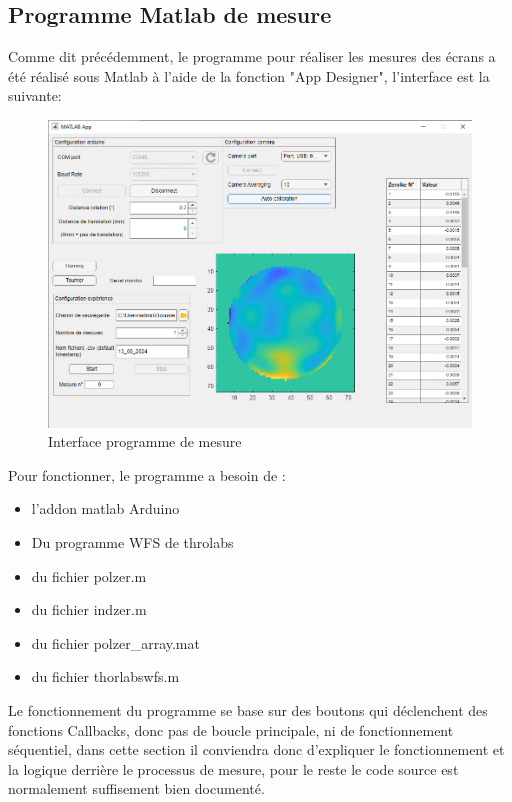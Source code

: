 \newpage
\subsection{Programme Matlab de mesure}
Comme dit précédemment, le programme pour réaliser les mesures des écrans a été réalisé sous Matlab à l'aide de la fonction "App Designer", l'interface est la suivante:
\begin{figure}[H]
    \centering
    \includegraphics[width = \textwidth]{assets/figures/ameliorations/capture interface.png}
    \caption{Interface programme de mesure}
\end{figure}
Pour fonctionner, le programme a besoin de :
\begin{itemize}
    \item l'addon matlab Arduino
    \item Du programme WFS de throlabs \cite{WFS_thorlabs_site}
    \item du fichier polzer.m
    \item du fichier indzer.m
    \item du fichier polzer\_array.mat
    \item du fichier thorlabswfs.m
\end{itemize}

Le fonctionnement du programme se base sur des boutons qui déclenchent des fonctions Callbacks, donc pas de boucle principale,
ni de fonctionnement séquentiel, dans cette section il conviendra donc d'expliquer le fonctionnement et la logique derrière le processus
de mesure, pour le reste le code source est normalement suffisement bien documenté.
\newpage

